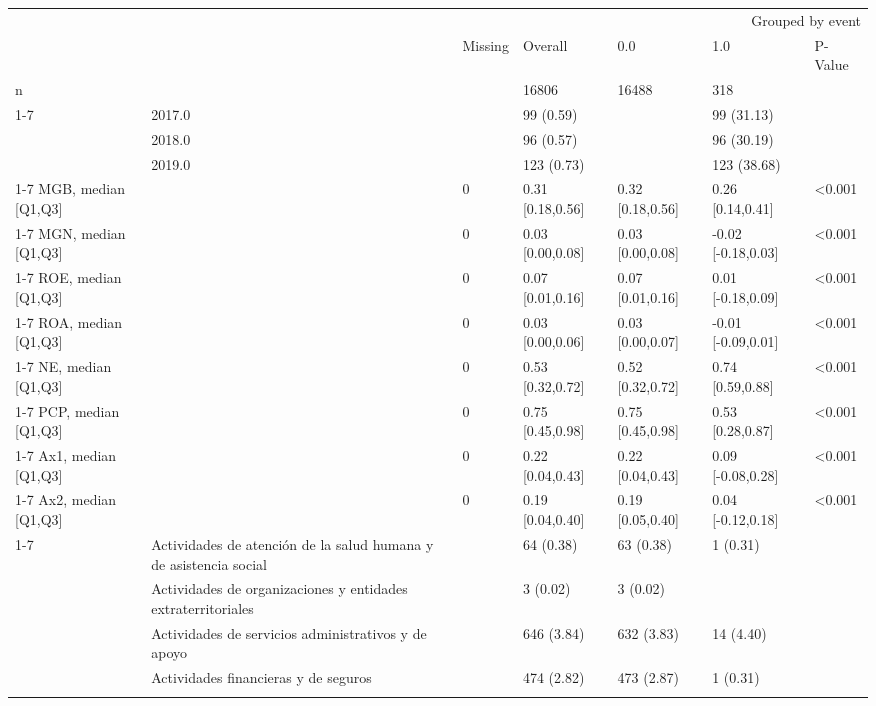\begin{tabular}{lllllll}
\toprule
 &  & \multicolumn{5}{r}{Grouped by event} \\
 &  & Missing & Overall & 0.0 & 1.0 & P-Value \\
\midrule
n &  &  & 16806 & 16488 & 318 &  \\
\cline{1-7}
\multirow[t]{4}{*}{time-event, n (%
 & 2017.0 &  & 99 (0.59) &  & 99 (31.13) &  \\
 & 2018.0 &  & 96 (0.57) &  & 96 (30.19) &  \\
 & 2019.0 &  & 123 (0.73) &  & 123 (38.68) &  \\
\cline{1-7}
MGB, median [Q1,Q3] &  & 0 & 0.31 [0.18,0.56] & 0.32 [0.18,0.56] & 0.26 [0.14,0.41] & <0.001 \\
\cline{1-7}
MGN, median [Q1,Q3] &  & 0 & 0.03 [0.00,0.08] & 0.03 [0.00,0.08] & -0.02 [-0.18,0.03] & <0.001 \\
\cline{1-7}
ROE, median [Q1,Q3] &  & 0 & 0.07 [0.01,0.16] & 0.07 [0.01,0.16] & 0.01 [-0.18,0.09] & <0.001 \\
\cline{1-7}
ROA, median [Q1,Q3] &  & 0 & 0.03 [0.00,0.06] & 0.03 [0.00,0.07] & -0.01 [-0.09,0.01] & <0.001 \\
\cline{1-7}
NE, median [Q1,Q3] &  & 0 & 0.53 [0.32,0.72] & 0.52 [0.32,0.72] & 0.74 [0.59,0.88] & <0.001 \\
\cline{1-7}
PCP, median [Q1,Q3] &  & 0 & 0.75 [0.45,0.98] & 0.75 [0.45,0.98] & 0.53 [0.28,0.87] & <0.001 \\
\cline{1-7}
Ax1, median [Q1,Q3] &  & 0 & 0.22 [0.04,0.43] & 0.22 [0.04,0.43] & 0.09 [-0.08,0.28] & <0.001 \\
\cline{1-7}
Ax2, median [Q1,Q3] &  & 0 & 0.19 [0.04,0.40] & 0.19 [0.05,0.40] & 0.04 [-0.12,0.18] & <0.001 \\
\cline{1-7}
\multirow[t]{20}{*}{Sector, n (%
 & Actividades de atención de la salud humana y de asistencia social &  & 64 (0.38) & 63 (0.38) & 1 (0.31) &  \\
 & Actividades de organizaciones y entidades extraterritoriales &  & 3 (0.02) & 3 (0.02) &  &  \\
 & Actividades de servicios administrativos y de apoyo &  & 646 (3.84) & 632 (3.83) & 14 (4.40) &  \\
 & Actividades financieras y de seguros &  & 474 (2.82) & 473 (2.87) & 1 (0.31) &  \\
}}
\end{tabular}
